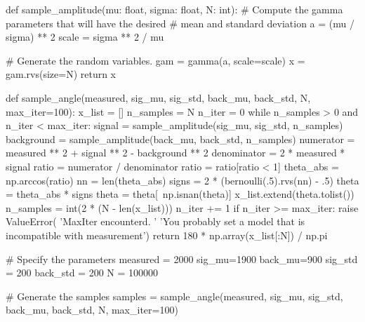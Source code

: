 \documentclass[paper=a4, fontsize=11pt]{scrartcl}
\numberwithin{equation}{section}		%
\numberwithin{figure}{section}			%
\numberwithin{table}{section}				%
\begin{document}
\begin{appendices}
\begin{python}
def sample_amplitude(mu: float, sigma: float, N: int):
    # Compute the gamma parameters that will have the desired
    # mean and standard deviation
    a = (mu / sigma) ** 2
    scale = sigma ** 2 / mu

    # Generate the random variables.
    gam = gamma(a, scale=scale)
    x = gam.rvs(size=N)
    return x

def sample_angle(measured, sig_mu, sig_std, back_mu, back_std, N, max_iter=100):
    x_list = []
    n_samples = N
    n_iter = 0
    while n_samples > 0 and n_iter < max_iter:
        signal = sample_amplitude(sig_mu, sig_std, n_samples)
        background = sample_amplitude(back_mu, back_std, n_samples)
        numerator = measured ** 2 + signal ** 2 - background ** 2
        denominator = 2 * measured * signal
        ratio = numerator / denominator
        ratio = ratio[ratio < 1]
        theta_abs = np.arccos(ratio)
        nn = len(theta_abs)
        signs = 2 * (bernoulli(.5).rvs(nn) - .5)
        theta = theta_abs * signs
        theta = theta[~np.isnan(theta)]
        x_list.extend(theta.tolist())
        n_samples = int(2 * (N - len(x_list)))
        n_iter += 1
    if n_iter >= max_iter:
        raise ValueError(
            'MaxIter encounterd.  '
            'You probably set a model that is incompatible with measurement')
    return 180 * np.array(x_list[:N]) / np.pi

# Specify the parameters
measured = 2000
sig_mu=1900
back_mu=900 
sig_std = 200
back_std = 200
N = 100000

# Generate the samples
samples = sample_angle(measured, sig_mu, sig_std, back_mu, back_std, N, max_iter=100)
\end{python}


\end{appendices}









\end{document}

